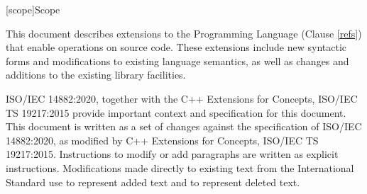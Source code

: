 
[scope]{Scope}

\pnum
This document describes extensions to the \Cpp Programming
Language (Clause \ref{refs}) that enable operations on source code. These
extensions include new syntactic forms and modifications to existing language
semantics, as well as changes and additions to the existing library facilities.

\pnum
ISO/IEC 14882:2020, together with the C++ Extensions for
Concepts, ISO/IEC TS 19217:2015 provide important context and specification for
this document. This document is written as a set of changes against the
specification of ISO/IEC 14882:2020, as modified by C++ Extensions for Concepts,
ISO/IEC TS 19217:2015.  Instructions to modify or add paragraphs are written as
explicit instructions.  Modifications made directly to existing text from the
International Standard use  to represent added text and
 to represent deleted text.
